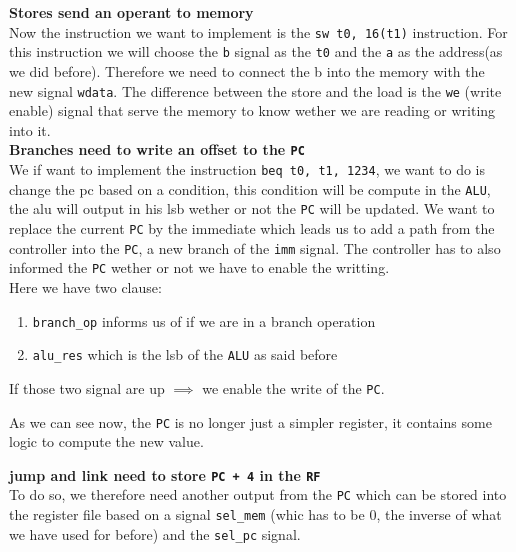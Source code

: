 \textbf{Stores send an operant to memory}\\
	Now the instruction we want to implement is the \texttt{sw t0, 16(t1)} instruction. For this instruction we will choose the \texttt{b} signal as the \texttt{t0} and the \texttt{a} as the address(as we did before). Therefore we need to connect the b into the memory with the new signal \texttt{wdata}. The difference between the store and the load is the \texttt{we} (write enable) signal that serve the memory to know wether we are reading or writing into it.\\
\textbf{Branches need to write an offset to the \texttt{PC}}\\
	We if want to implement the instruction \texttt{beq t0, t1, 1234}, we want to do is change the pc based on a condition, this condition will be compute in the \texttt{ALU}, the alu will output in his lsb wether or not the \texttt{PC} will be updated. We want to replace the current \texttt{PC} by the immediate which leads us to add a path from the controller into the \texttt{PC}, a new branch of the \texttt{imm} signal. The controller has to also informed the \texttt{PC} wether or not we have to enable the writting.\\
	Here we have two clause:
	\begin{enumerate}
	    \item \texttt{branch\_op} \textrightarrow informs us of if we are in a branch operation 
	    \item \texttt{alu\_res} which is the lsb of the \texttt{ALU} as said before
	\end{enumerate}
	If those two signal are up $\implies$ we enable the write of the \texttt{PC}.
    \begin{framedremark}
    As we can see now, the \texttt{PC} is no longer just a simpler register, it contains some logic to compute the new value.
    \end{framedremark}
\textbf{jump and link need to store \texttt{PC + 4} in the \texttt{RF}}\\
    To do so, we therefore need another output from the \texttt{PC} which can be stored into the register file based on a signal \texttt{sel\_mem} (whic has to be 0, the inverse of what we have used for before) and the \texttt{sel\_pc} signal.\\
